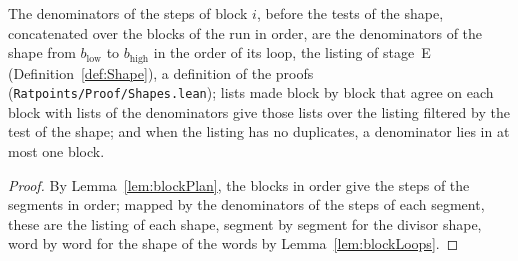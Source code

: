 \begin{lemma}\label{lem:blockDens}
  \leanok
  The denominators of the steps of block $i$, before the tests of the shape, concatenated over the
  blocks of the run in order, are the denominators of the shape from $b_{\mathrm{low}}$ to
  $b_{\mathrm{high}}$ in the order of its loop, the listing of stage~E (Definition~\ref{def:Shape}),
  a definition of the proofs (\verb|Ratpoints/Proof/Shapes.lean|); lists made block by block that
  agree on each block with lists of the denominators give those lists over the listing filtered by
  the test of the shape; and when the listing has no duplicates, a denominator lies in at most one
  block.
\end{lemma}

\begin{proof}
  \leanok
  By Lemma~\ref{lem:blockPlan}, the blocks in order give the steps of the segments in order; mapped
  by the denominators of the steps of each segment, these are the listing of each shape, segment by
  segment for the divisor shape, word by word for the shape of the words by
  Lemma~\ref{lem:blockLoops}.
\end{proof}

